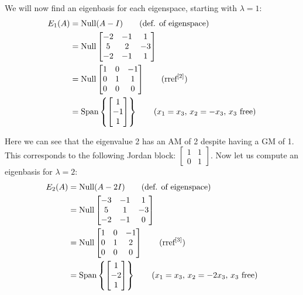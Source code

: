 \documentclass{article}
\begin{document}
We will now find an eigenbasis for each eigenspace, starting with $\lambda=1$:
\begin{align*}
  E_1(A)&=\text{Null}(A-I)\tag{def. of eigenspace}\\
  &=\text{Null}\begin{bmatrix}
    -2&-1&1\\5&2&-3\\-2&-1&1
  \end{bmatrix}\\
  &=\text{Null}\begin{bmatrix}
    1&0&-1\\
    0&1&1\\
    0&0&0
  \end{bmatrix}\tag{$\text{rref}^{[2]}$}\\
  &=\text{Span}\left\{\begin{bmatrix} 1\\-1\\1\end{bmatrix}\right\}\tag{$x_1=x_3$, $x_2=-x_3$, $x_3$ free}
\end{align*}

Here we can see that the eigenvalue 2 has an AM of 2 despite having a GM of 1. This corresponds to the following Jordan block: $\begin{bmatrix}1&1\\0&1\end{bmatrix}$. Now let us compute an eigenbasis for $\lambda=2$:
\begin{align*}
  E_2(A)&=\text{Null}(A-2I)\tag{def. of eigenspace}\\
  &=\text{Null}\begin{bmatrix}
    -3&-1&1\\5&1&-3\\-2&-1&0
  \end{bmatrix}\\
  &=\text{Null}\begin{bmatrix}
    1&0&-1\\
    0&1&2\\
    0&0&0
  \end{bmatrix}\tag{$\text{rref}^{[3]}$}\\
  &=\text{Span}\left\{\begin{bmatrix} 1\\-2\\1\end{bmatrix}\right\}\tag{$x_1=x_3$, $x_2=-2x_3$, $x_3$ free}
\end{align*}
\end{document}
